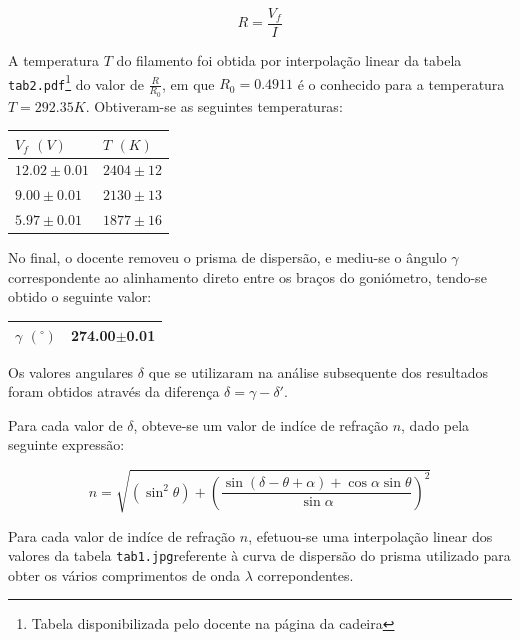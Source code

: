 \documentclass[9pt]{extarticle}
\newcommand{\PC}[1]{\ensuremath{\left(#1\right)}}
\begin{document}
\begin{multicols}{2}
\begin{equation}
R=\frac{V_f}{I}
\end{equation}

\par A temperatura $T$ do filamento foi obtida por interpolação linear da tabela \verb|tab2.pdf|\footnote{\label{note1}Tabela disponibilizada pelo docente na página da cadeira} do valor de $\frac{R}{R_0}$, em que $R_0=0.4911$ é o conhecido para a temperatura $T=292.35K$. Obtiveram-se as seguintes temperaturas:

\begin{center}
\begin{tabular}{ x{2cm} x{2cm} }
$V_f$ $(V)$ & $T$ $(K)$ \tabularnewline
\hline \hline
$12.02\pm0.01$ & $2404\pm12$ \tabularnewline
$9.00\pm0.01$ & $2130\pm13$ \tabularnewline
$5.97\pm0.01$ & $1877\pm16$ \tabularnewline
\end{tabular}
\par{}
\end{center}

\par No final, o docente removeu o prisma de dispersão, e mediu-se o ângulo $\gamma$ correspondente ao alinhamento direto entre os braços do goniómetro, tendo-se obtido o seguinte valor:

\begin{center}
\begin{tabular}{ x{1cm} x{2cm} }
\hline \hline
$\gamma$ $(^\circ)$ & 274.00$\pm$0.01 \tabularnewline
\hline \hline
\end{tabular}
\end{center}

\par Os valores angulares $\delta$ que se utilizaram na análise subsequente dos resultados foram obtidos através da diferença $\delta=\gamma-\delta'$.

\par Para cada valor de $\delta$, obteve-se um valor de indíce de refração $n$, dado pela seguinte expressão:

\begin{equation} \label{eq:n}
n=\sqrt{\PC{\sin^2{\theta}}+ \PC{\frac{\sin{\PC{\delta-\theta+\alpha}}+ \cos{\alpha}\sin{\theta}}{\sin{\alpha}}}^2}
\end{equation}

\par Para cada valor de indíce de refração $n$, efetuou-se uma interpolação linear dos valores da tabela \verb|tab1.jpg|\footnotemark[\ref{note1}] referente à curva de dispersão do prisma utilizado para obter os vários comprimentos de onda $\lambda$ correpondentes.


\end{multicols}
\end{document}
